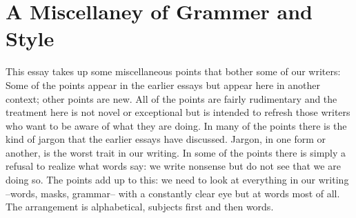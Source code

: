 \documentclass[
    oneside,
    11pt,
]{memoir}
\begin{document}
\chapter{A Miscellaney of Grammer and Style}

This essay takes up some miscellaneous points that bother some of our writers: Some of the points appear in the earlier essays but appear here in another context; other points are new. All of the points are fairly rudimentary and the treatment here is not novel or exceptional but is intended to refresh those writers who want to be aware of what they are doing. In many of the points there is the kind of jargon that the earlier essays have discussed. Jargon, in one form or another, is the worst trait in our writing. In some of the points there is simply a refusal to realize what words say: we write nonsense but do not see that we are doing so. The points add up to this: we need to look at everything in our writing --words, masks, grammar-- with a constantly clear eye but at words most of all. The arrangement is alphabetical, subjects first and then words. 
\end{document}
